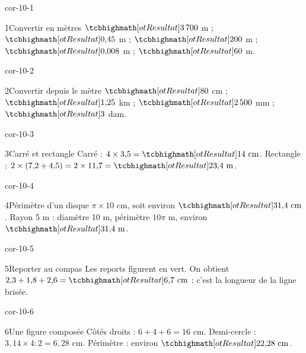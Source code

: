 \clearpage\pagestyle{otMain}\setlength{\otBlocEspacement}{2.5mm}\fontsize{11}{15}\selectfont{}
\begin{blocLivre}{cor-10-1}\begin{corrige}{1}{Convertir en mètres}
$\res{3\,700}$ m ; $\res{0{,}45}$ m ; $\res{200}$ m ; $\res{0{,}008}$ m ; $\res{60}$ m.
\end{corrige}\end{blocLivre}
\begin{blocLivre}{cor-10-2}\begin{corrige}{2}{Convertir depuis le mètre}
$\res{80}$ cm ; $\res{1{,}25}$ km ; $\res{2\,500}$ mm ; $\res3$ dam.
\end{corrige}\end{blocLivre}
\begin{blocLivre}{cor-10-3}\begin{corrige}{3}{Carré et rectangle}
Carré : $4\times3{,}5=\res{14\ \mathrm{cm}}$. Rectangle : $2\times(7{,}2+4{,}5)=2\times11{,}7=\res{23{,}4\ \mathrm{m}}$.
\end{corrige}\end{blocLivre}
\begin{blocLivre}{cor-10-4}\begin{corrige}{4}{Périmètre d’un disque}
$\pi\times10$ cm, soit environ $\res{31{,}4\ \mathrm{cm}}$. Rayon 5 m : diamètre 10 m, périmètre $10\pi$ m, environ $\res{31{,}4\ \mathrm{m}}$.
\end{corrige}\end{blocLivre}
\begin{blocLivre}{cor-10-5}\begin{corrige}{5}{Reporter au compas}
Les reports figurent en vert. On obtient $2{,}3+1{,}8+2{,}6=\res{6{,}7\ \mathrm{cm}}$ : c’est la longueur de la ligne brisée.
\label{fig-cor-10-5}
\end{corrige}\end{blocLivre}
\begin{blocLivre}{cor-10-6}\begin{corrige}{6}{Une figure composée}
Côtés droits : $6+4+6=16$ cm. Demi-cercle : $3{,}14\times4:2=6{,}28$ cm. Périmètre : environ $\res{22{,}28\ \mathrm{cm}}$.
\label{fig-cor-10-6}
\end{corrige}\end{blocLivre}
